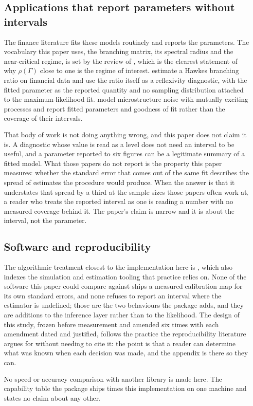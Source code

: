 \subsection{Applications that report parameters without intervals}

The finance literature fits these models routinely and reports the parameters. The
vocabulary this paper uses, the branching matrix, its spectral radius and the
near-critical regime, is set by the review of \citet{bacry2015}, which is the
clearest statement of why $\rho(\Gamma)$ close to one is the regime of interest.
\citet{filimonov2012} estimate a Hawkes branching ratio on financial data and use
the ratio itself as a reflexivity diagnostic, with the fitted parameter as the
reported quantity and no sampling distribution attached to the maximum-likelihood
fit. \citet{bacry2013} model microstructure noise with mutually exciting processes
and report fitted parameters and goodness of fit rather than the coverage of their
intervals.

That body of work is not doing anything wrong, and this paper does not claim it is.
A diagnostic whose value is read as a level does not need an interval to be useful,
and a parameter reported to six figures can be a legitimate summary of a fitted
model. What those papers do not report is the property this paper measures: whether
the standard error that comes out of the same fit describes the spread of estimates
the procedure would produce. When the answer is that it understates that spread by
a third at the sample sizes those papers often work at, a reader who treats the
reported interval as one is reading a number with no measured coverage behind it.
The paper's claim is narrow and it is about the interval, not the parameter.

\subsection{Software and reproducibility}

The algorithmic treatment closest to the implementation here is \citet{bacry2015},
which also indexes the simulation and estimation tooling that practice relies on.
None of the software this paper could compare against ships a measured calibration
map for its own standard errors, and none refuses to report an interval where the
estimator is undefined; those are the two behaviours the package adds, and they are
additions to the inference layer rather than to the likelihood. The design of this
study, frozen before measurement and amended six times with each amendment dated
and justified, follows the practice the reproducibility literature argues for
without needing to cite it: the point is that a reader can determine what was known
when each decision was made, and the appendix is there so they can.

No speed or accuracy comparison with another library is made here. The capability
table the package ships times this implementation on one machine and states no
claim about any other.
